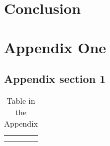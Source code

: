 \documentclass[11pt]{book}
\begin{document}
\chapter{Conclusion}
\label{chapter:conclusion}


\balance



\newpage
\newcommand{\beginsupplement}{%
    \setcounter{chapter}{0}
    \renewcommand{\thechapter}{\Alph{chapter}}%
 }

\beginsupplement
\chapter{Appendix One}
\section{Appendix section 1}
\begin{table}[]
    \centering
    \begin{tabular}{c|c}
         &  \\
         & 
    \end{tabular}
    \caption{Table in the Appendix}
    \label{tab:my_label}
\end{table}
\end{document}
